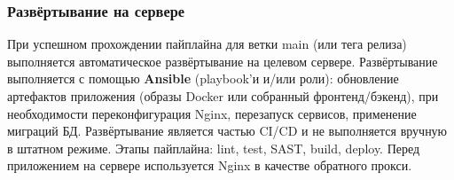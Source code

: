 \subsubsection{Развёртывание на сервере}

При успешном прохождении пайплайна для ветки main (или тега релиза) выполняется автоматическое развёртывание на целевом сервере. Развёртывание выполняется с помощью \textbf{Ansible} (playbook’и и/или роли): обновление артефактов приложения (образы Docker или собранный фронтенд/бэкенд), при необходимости переконфигурация Nginx, перезапуск сервисов, применение миграций БД. Развёртывание является частью CI/CD и не выполняется вручную в штатном режиме. Этапы пайплайна: lint, test, SAST, build, deploy. Перед приложением на сервере используется Nginx в качестве обратного прокси.

